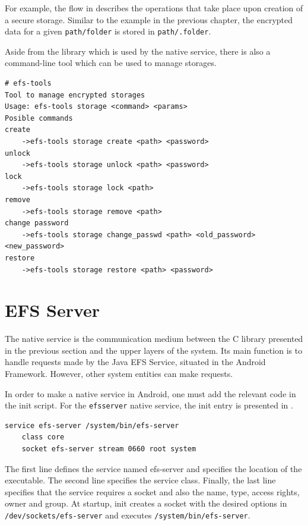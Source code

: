 For example, the flow in  describes the operations that take place upon creation of a secure storage. Similar to the example in the previous chapter, the encrypted data for a given \texttt{path/folder} is stored in \texttt{path/.folder}.

Aside from the library which is used by the native service, there is also a command-line tool which can be used to manage storages. 

\begin{lstlisting}[numbers=none, basicstyle=\footnotesize, caption=efs-tools binary, label=lst:efs-tools]
# efs-tools                                              
Tool to manage encrypted storages
Usage: efs-tools storage <command> <params>
Posible commands
create
	->efs-tools storage create <path> <password>
unlock
	->efs-tools storage unlock <path> <password>
lock
	->efs-tools storage lock <path>
remove
	->efs-tools storage remove <path>
change password
	->efs-tools storage change_passwd <path> <old_password> <new_password>
restore
	->efs-tools storage restore <path> <password>
\end{lstlisting}

\section{EFS Server}
\label{sec:native-service-multi-user}

The native service is the communication medium between the C library presented in the previous section and the upper layers of the system. Its main function is to handle requests made by the Java EFS Service, situated in the Android Framework. However, other system entities can make requests.

In order to make a native service in Android, one must add the relevant code in the init script.
For the \texttt{efsserver} native service, the init entry is presented in .

\begin{lstlisting}[numbers=none, caption=efsserver init entry, label=lst:efsserver-init]
service efs-server /system/bin/efs-server
    class core
    socket efs-server stream 0660 root system
\end{lstlisting}

The first line defines the service named efs-server and specifies the location of the executable.
The second line specifies the service class. Finally, the last line specifies that the service requires a socket and also the name, type, access rights, owner and group. At startup, init creates a socket with the desired options in \texttt{/dev/sockets/efs-server} and executes \texttt{/system/bin/efs-server}.

